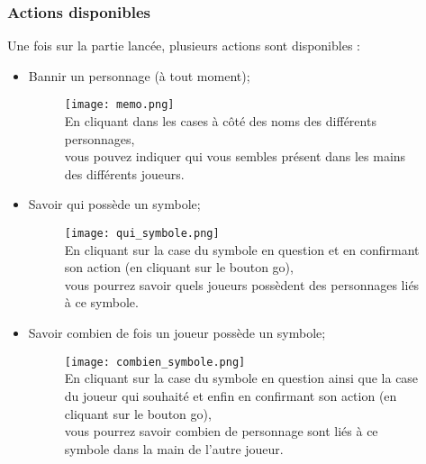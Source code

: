 \subsubsection{Actions disponibles}

Une fois sur la partie lancée, plusieurs actions sont disponibles :
\begin{itemize}
  \item Bannir un personnage (à tout moment);
  \begin{figure}[H]
       \begin{center}
           \texttt{[image: memo.png]}
           \\
           \tiny En cliquant dans les cases à côté des noms des différents personnages, \\vous pouvez indiquer qui vous sembles présent dans les mains des différents joueurs.
       \end{center}
       \label{fig:memo}
   \end{figure}

  \item Savoir qui possède un symbole;
  \begin{figure}[H]
       \begin{center}
           \texttt{[image: qui\_symbole.png]}
           \\
           \tiny En cliquant sur la case du symbole en question et en confirmant son action (en cliquant sur le bouton go), \\vous pourrez savoir quels joueurs possèdent des personnages liés à ce symbole.
       \end{center}
       \label{fig:qui_symbole}
   \end{figure}

  \item Savoir combien de fois un joueur possède un symbole;
  \begin{figure}[H]
       \begin{center}
           \texttt{[image: combien\_symbole.png]}
           \\
           \tiny En cliquant sur la case du symbole en question ainsi que la case du joueur qui souhaité et enfin en confirmant son action (en cliquant sur le bouton go), \\vous pourrez savoir combien de personnage sont liés à ce symbole dans la main de l'autre joueur.
       \end{center}
       \label{fig:combien_symbole}
   \end{figure}


\end{itemize}
